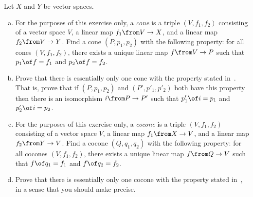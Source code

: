 \begin{iquestion}
Let $X$ and $Y$ be vector spaces.  
% 
\begin{enumerate}[(b)]
\item   
\label{part:vs-prod}
For the purposes of this exercise only, a \emph{cone} is a triple $(V, f_1,
f_2)$ consisting of a vector space $V$, a linear map $f_1\from V \to X$, and
a linear map $f_2\from V \to Y$.  Find a cone $(P, p_1,
p_2)$ with the following property: for all cones $(V, f_1, f_2)$, there exists
a unique linear map $f\from V \to P$ such that $p_1 \of f = f_1$ and $p_2 \of f
= f_2$.

\item 
Prove that there is essentially only one cone with the property stated
in~.  That is, prove that if $(P, p_1, p_2)$ and $(P',
p'_1, p'_2)$ both have this property then there is an isomorphism $i\from P
\to P'$ such that $p'_1 \of i = p_1$ and $p'_2 \of i = p_2$.

\item   
\label{part:vs-coprod} 
For the purposes of this exercise only, a \emph{cocone} is a triple $(V,
f_1, f_2)$ consisting of a vector space $V$, a linear map $f_1\from X \to
V$, and a linear map $f_2\from Y \to V$.  Find a cocone $(Q, q_1, q_2)$
with the following property: for all cocones $(V, f_1, f_2)$, there exists
a unique linear map $f\from Q \to V$ such that $f \of q_1 = f_1$ and $f \of
q_2 = f_2$.

\item 
Prove that there is essentially only one cocone with the property stated
 in~, in a sense that you should make precise.  
\end{enumerate}
\end{iquestion}
